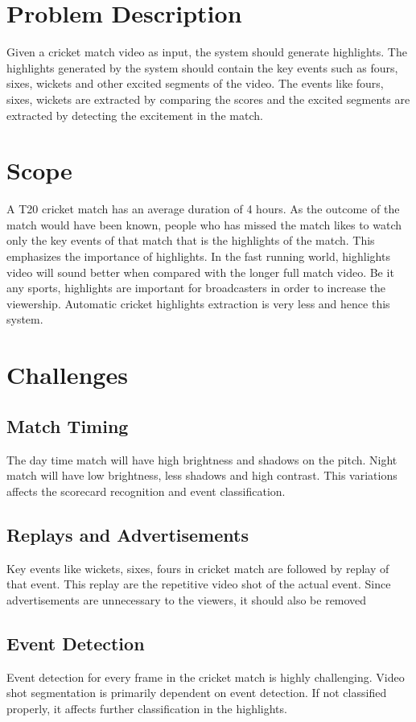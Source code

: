 \section{Problem Description}
Given a cricket match video as input, the system should generate highlights. The highlights generated by the system should contain the key events such as fours, sixes, wickets and other excited segments of the video. The events like fours, sixes, wickets are extracted by comparing the scores and the excited segments are extracted by detecting the excitement in the match.
\section{Scope}
A T20 cricket match has an average duration of 4 hours. As the outcome of the match would have been known, people who has missed the match likes to watch only the key events of that match that is the highlights of the match. This emphasizes the importance of highlights. In the fast running world, highlights video will sound better when compared with the longer full match video. Be it any sports, highlights are important for broadcasters in order to increase the viewership. Automatic cricket highlights extraction is very less and hence this system.
\section{Challenges}%
\subsection{Match Timing}
The day time match will have high brightness and shadows on the pitch. Night match will have low brightness, less shadows and high contrast. This variations affects the scorecard recognition and event classification. 
\subsection{Replays and Advertisements}
Key events like  wickets, sixes, fours in cricket match are followed by replay of that event. This replay are the repetitive video shot of the actual event. Since advertisements are unnecessary to the viewers, it should also be removed
\subsection{Event Detection}
Event detection for every frame in the cricket match is highly challenging. Video shot segmentation is primarily dependent on event detection. If not classified properly, it affects further classification in the highlights.
